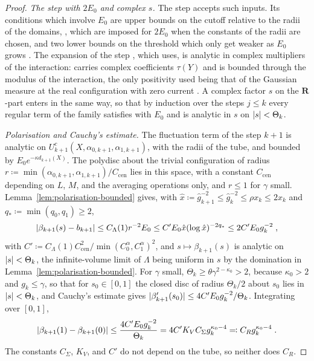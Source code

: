 \documentclass[11pt]{preprint}
\DeclarePairedDelimiter{\abs}{\lvert}{\rvert}
\numberwithin{equation}{section}
\theoremstyle{definition}
\theoremstyle{remark}
\theoremstyle{plain}
\begin{document}
\begin{proof}
\emph{The step with $2E_0$ and complex $s$.} The step accepts such inputs. Its conditions which involve $E_0$ are upper bounds on the cutoff relative to the radii of the domains, \cite[pp.~18, 20, 21]{BalabanRG2}, which are imposed for $2E_0$ when the constants of the radii are chosen, and two lower bounds on the threshold which only get weaker as $E_0$ grows \cite[pp.~16, 19]{BalabanRG2}. The expansion of the step \cite[Sect.~2]{BalabanRG2}, which \cite[p.~277]{BalabanCRE} uses, is analytic in complex multipliers of the interaction: \cite[(2.14), p.~15]{BalabanRG2} carries complex coefficients $\tau(Y)$ and is bounded through the modulus of the interaction, the only positivity used being that of the Gaussian measure at the real configuration with zero current \cite[p.~15]{BalabanRG2}. A complex factor $s$ on the $\mathbf R$-part enters in the same way, so that by induction over the steps $j \leq k$ every regular term of the family satisfies \cite[(1.18), p.~263]{BalabanRG1} with $E_0$ and is analytic in $s$ on $\abs{s} < \Theta_k$.

\emph{Polarisation and Cauchy's estimate.} The fluctuation term of the step $k + 1$ is analytic on $U^c_{k+1}(X, \alpha_{0,k+1}, \alpha_{1,k+1})$, with the radii of the tube, and bounded by $E_0e^{-\kappa d_{k+1}(X)}$. The polydisc about the trivial configuration of radius $r \coloneqq \min(\alpha_{0,k+1}, \alpha_{1,k+1})/C_{\mathrm{cen}}$ lies in this space, with a constant $C_{\mathrm{cen}}$ depending on $L$, $M$, and the averaging operations only, and $r \leq 1$ for $\gamma$ small. Lemma~\ref{lem:polarisation-bounded} gives, with $\hat x \coloneqq \hat g_{k+1}^{-2} \leq \hat g_k^{-2} \leq \rho x_k \leq 2x_k$ and $q_* \coloneqq \min(q_0, q_1) \geq 2$,
\begin{equation}\label{eq:polarisation-tube}
    \abs{\beta_{k+1}(s) - b_{k+1}} \leq C_\Lambda(1)r^{-2}E_0 \leq C'E_0\hat x(\log\hat x)^{-2q_*} \leq 2C'E_0g_k^{-2}\;,
\end{equation}
with $C' \coloneqq C_\Lambda(1)C_{\mathrm{cen}}^2/\min(C^\alpha_0, C^\alpha_1)^2$, and $s \mapsto \beta_{k+1}(s)$ is analytic on $\abs{s} < \Theta_k$, the infinite-volume limit of $\Lambda$ being uniform in $s$ by the domination in Lemma~\ref{lem:polarisation-bounded}. For $\gamma$ small, $\Theta_k \geq \theta\gamma^{2-\kappa_0} > 2$, because $\kappa_0 > 2$ and $g_k \leq \gamma$, so that for $s_0 \in [0, 1]$ the closed disc of radius $\Theta_k/2$ about $s_0$ lies in $\abs{s} < \Theta_k$, and Cauchy's estimate gives $\abs{\beta'_{k+1}(s_0)} \leq 4C'E_0g_k^{-2}/\Theta_k$. Integrating over $[0, 1]$,
\begin{equation}\label{eq:r-shift-final}
    \abs{\beta_{k+1}(1) - \beta_{k+1}(0)} \leq \frac{4C'E_0g_k^{-2}}{\Theta_k} = 4C'K_VC_\Sigma g_k^{\kappa_0-4} \eqqcolon C_Rg_k^{\kappa_0-4}\;.
\end{equation}
The constants $C_\Sigma$, $K_V$, and $C'$ do not depend on the tube, so neither does $C_R$.
\end{proof}
\end{document}
